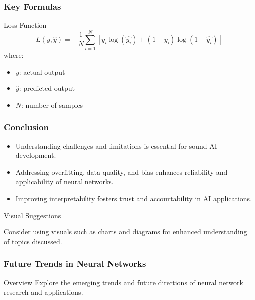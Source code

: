 \documentclass[aspectratio=169]{beamer}
\begin{document}
\begin{frame}[fragile]
    \frametitle{Key Formulas}
    \begin{block}{Loss Function}
        \[
        L(y, \hat{y}) = -\frac{1}{N} \sum_{i=1}^{N} \left[ y_i \log(\hat{y_i}) + (1 - y_i) \log(1 - \hat{y_i}) \right]
        \]
        where:
        \begin{itemize}
            \item $y$: actual output
            \item $\hat{y}$: predicted output
            \item $N$: number of samples
        \end{itemize}
    \end{block}
\end{frame}

\begin{frame}[fragile]
    \frametitle{Conclusion}
    \begin{itemize}
        \item Understanding challenges and limitations is essential for sound AI development.
        \item Addressing overfitting, data quality, and bias enhances reliability and applicability of neural networks.
        \item Improving interpretability fosters trust and accountability in AI applications.
    \end{itemize}
    \begin{block}{Visual Suggestions}
        \item Consider using visuals such as charts and diagrams for enhanced understanding of topics discussed.
    \end{block}
\end{frame}

\begin{frame}[fragile]
    \frametitle{Future Trends in Neural Networks}
    \begin{block}{Overview}
        Explore the emerging trends and future directions of neural network research and applications.
    \end{block}
\end{frame}
\end{document}
